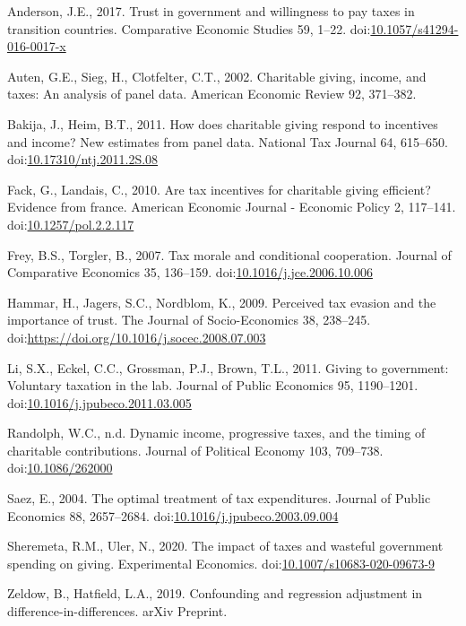 \documentclass[ review  , 3p ]{elsarticle}
\begin{document}
  \leavevmode\hypertarget{ref-Anderson2017}{}%
  Anderson, J.E., 2017. Trust in government and willingness to pay taxes in transition countries. Comparative Economic Studies 59, 1--22. doi:\href{https://doi.org/10.1057/s41294-016-0017-x}{10.1057/s41294-016-0017-x}
  
  \leavevmode\hypertarget{ref-Auten2002}{}%
  Auten, G.E., Sieg, H., Clotfelter, C.T., 2002. Charitable giving, income, and taxes: An analysis of panel data. American Economic Review 92, 371--382.
  
  \leavevmode\hypertarget{ref-Bakija2011}{}%
  Bakija, J., Heim, B.T., 2011. How does charitable giving respond to incentives and income? New estimates from panel data. National Tax Journal 64, 615--650. doi:\href{https://doi.org/10.17310/ntj.2011.2S.08}{10.17310/ntj.2011.2S.08}
  
  \leavevmode\hypertarget{ref-Fack2010}{}%
  Fack, G., Landais, C., 2010. Are tax incentives for charitable giving efficient? Evidence from france. American Economic Journal - Economic Policy 2, 117--141. doi:\href{https://doi.org/10.1257/pol.2.2.117}{10.1257/pol.2.2.117}
  
  \leavevmode\hypertarget{ref-Frey2007}{}%
  Frey, B.S., Torgler, B., 2007. Tax morale and conditional cooperation. Journal of Comparative Economics 35, 136--159. doi:\href{https://doi.org/10.1016/j.jce.2006.10.006}{10.1016/j.jce.2006.10.006}
  
  \leavevmode\hypertarget{ref-Hammar2009}{}%
  Hammar, H., Jagers, S.C., Nordblom, K., 2009. Perceived tax evasion and the importance of trust. The Journal of Socio-Economics 38, 238--245. doi:\href{https://doi.org/https://doi.org/10.1016/j.socec.2008.07.003}{https://doi.org/10.1016/j.socec.2008.07.003}
  
  \leavevmode\hypertarget{ref-Li2011}{}%
  Li, S.X., Eckel, C.C., Grossman, P.J., Brown, T.L., 2011. Giving to government: Voluntary taxation in the lab. Journal of Public Economics 95, 1190--1201. doi:\href{https://doi.org/10.1016/j.jpubeco.2011.03.005}{10.1016/j.jpubeco.2011.03.005}
  
  \leavevmode\hypertarget{ref-Randolph1995}{}%
  Randolph, W.C., n.d. Dynamic income, progressive taxes, and the timing of charitable contributions. Journal of Political Economy 103, 709--738. doi:\href{https://doi.org/10.1086/262000}{10.1086/262000}
  
  \leavevmode\hypertarget{ref-Saez2004}{}%
  Saez, E., 2004. The optimal treatment of tax expenditures. Journal of Public Economics 88, 2657--2684. doi:\href{https://doi.org/10.1016/j.jpubeco.2003.09.004}{10.1016/j.jpubeco.2003.09.004}
  
  \leavevmode\hypertarget{ref-Sheremeta2020}{}%
  Sheremeta, R.M., Uler, N., 2020. The impact of taxes and wasteful government spending on giving. Experimental Economics. doi:\href{https://doi.org/10.1007/s10683-020-09673-9}{10.1007/s10683-020-09673-9}
  
  \leavevmode\hypertarget{ref-Zeldow2019}{}%
  Zeldow, B., Hatfield, L.A., 2019. Confounding and regression adjustment in difference-in-differences. arXiv Preprint.
\end{document}
